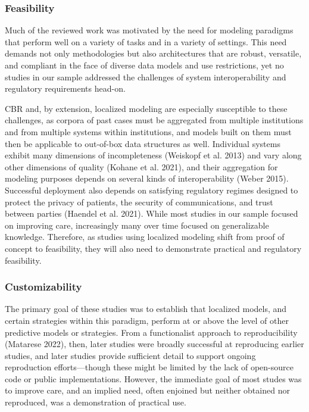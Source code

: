 \documentclass{article}
\begin{document}
\hypertarget{feasibility}{%
\subsubsection{Feasibility}\label{feasibility}}

Much of the reviewed work was motivated by the need for modeling
paradigms that perform well on a variety of tasks and in a variety of
settings. This need demands not only methodologies but also
architectures that are robust, versatile, and compliant in the face of
diverse data models and use restrictions, yet no studies in our sample
addressed the challenges of system interoperability and regulatory
requirements head-on.

CBR and, by extension, localized modeling are especially susceptible to
these challenges, as corpora of past cases must be aggregated from
multiple institutions and from multiple systems within institutions, and
models built on them must then be applicable to out-of-box data
structures as well. Individual systems exhibit many dimensions of
incompleteness (Weiskopf et al. 2013) and vary along other dimensions of
quality (Kohane et al. 2021), and their aggregation for modeling
purposes depends on several kinds of interoperability (Weber 2015).
Successful deployment also depends on satisfying regulatory regimes
designed to protect the privacy of patients, the security of
communications, and trust between parties (Haendel et al. 2021). While
most studies in our sample focused on improving care, increasingly many
over time focused on generalizable knowledge. Therefore, as studies
using localized modeling shift from proof of concept to feasibility,
they will also need to demonstrate practical and regulatory feasibility.

\hypertarget{customizability}{%
\subsubsection{Customizability}\label{customizability}}

The primary goal of these studies was to establish that localized
models, and certain strategies within this paradigm, perform at or above
the level of other predictive models or strategies. From a functionalist
approach to reproducibility (Matarese 2022), then, later studies were
broadly successful at reproducing earlier studies, and later studies
provide sufficient detail to support ongoing reproduction
efforts---though these might be limited by the lack of open-source code
or public implementations. However, the immediate goal of most studes
was to improve care, and an implied need, often enjoined but neither
obtained nor reproduced, was a demonstration of practical use.
\end{document}
